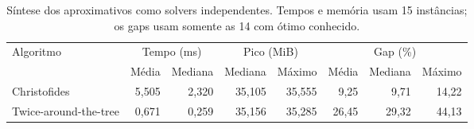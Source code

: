 \documentclass[12pt]{article}
\begin{document}
\begin{table}[H]
  \centering
  \caption{Síntese dos aproximativos como solvers independentes. Tempos e
  memória usam 15 instâncias; os gaps usam somente as 14 com ótimo conhecido.}
  \label{tab:independent-summary}
  \footnotesize
  \begin{tabular}{lrrrrrrr}
    \hline
    Algoritmo & \multicolumn{2}{c}{Tempo (ms)} & \multicolumn{2}{c}{Pico (MiB)} & \multicolumn{3}{c}{Gap (\%)} \\
               & Média & Mediana & Mediana & Máximo & Média & Mediana & Máximo \\
    \hline
    Christofides          & 5,505 & 2,320 & 35,105 & 35,555 & 9,25  & 9,71  & 14,22 \\
    Twice-around-the-tree & 0,671 & 0,259 & 35,156 & 35,285 & 26,45 & 29,32 & 44,13 \\
    \hline
  \end{tabular}
\end{table}
\end{document}
